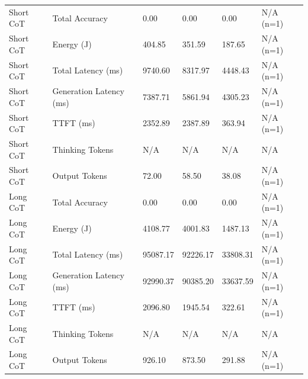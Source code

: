 \begin{table}
\begin{tabular}{llllll}
Short CoT & Total Accuracy & 0.00 & 0.00 & 0.00 & N/A (n=1) \\
Short CoT & Energy (J) & 404.85 & 351.59 & 187.65 & N/A (n=1) \\
Short CoT & Total Latency (ms) & 9740.60 & 8317.97 & 4448.43 & N/A (n=1) \\
Short CoT & Generation Latency (ms) & 7387.71 & 5861.94 & 4305.23 & N/A (n=1) \\
Short CoT & TTFT (ms) & 2352.89 & 2387.89 & 363.94 & N/A (n=1) \\
Short CoT & Thinking Tokens & N/A & N/A & N/A & N/A \\
Short CoT & Output Tokens & 72.00 & 58.50 & 38.08 & N/A (n=1) \\
Long CoT & Total Accuracy & 0.00 & 0.00 & 0.00 & N/A (n=1) \\
Long CoT & Energy (J) & 4108.77 & 4001.83 & 1487.13 & N/A (n=1) \\
Long CoT & Total Latency (ms) & 95087.17 & 92226.17 & 33808.31 & N/A (n=1) \\
Long CoT & Generation Latency (ms) & 92990.37 & 90385.20 & 33637.59 & N/A (n=1) \\
Long CoT & TTFT (ms) & 2096.80 & 1945.54 & 322.61 & N/A (n=1) \\
Long CoT & Thinking Tokens & N/A & N/A & N/A & N/A \\
Long CoT & Output Tokens & 926.10 & 873.50 & 291.88 & N/A (n=1) \\
\bottomrule
\end{tabular}
\end{table}
